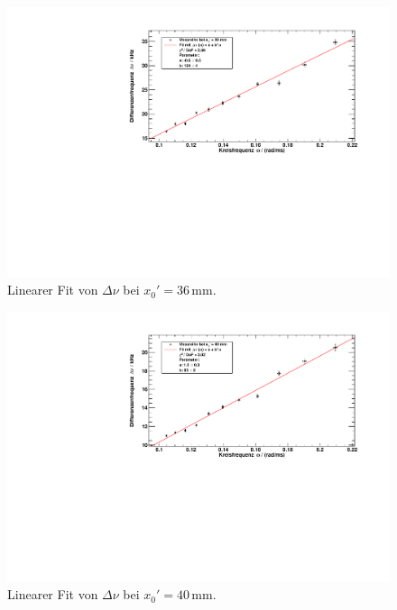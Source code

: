 \begin{figure}[H]
\begin{center}
  \includegraphics[width=\textwidth]{../img/fit_x0_36mm.pdf}
  \caption{Linearer Fit von $\Delta \nu$ bei $x_0' = 36$\,mm.}
  \label{img:fit:T:36mm}
\end{center}
\end{figure}

\begin{figure}[H]
\begin{center}
  \includegraphics[width=\textwidth]{../img/fit_x0_40mm.pdf}
  \caption{Linearer Fit von $\Delta \nu$ bei $x_0' = 40$\,mm.}
  \label{img:fit:T:40mm}
\end{center}
\end{figure}

